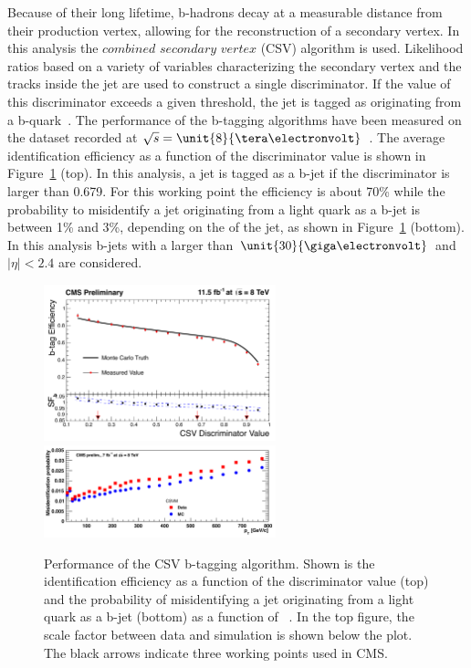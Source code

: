 Because of their long lifetime, b-hadrons decay at a measurable distance from their production vertex, allowing for the reconstruction of a secondary vertex. In this analysis the $\textit{combined}$ $\textit{secondary}$ $\textit{vertex}$ (CSV) algorithm is used. Likelihood ratios based on a variety of variables characterizing the secondary vertex and the tracks inside the jet are used to construct a single discriminator. If the value of this discriminator exceeds a given threshold, the jet is tagged as originating from a b-quark~\cite{Chatrchyan:2012jua}. The performance of the b-tagging algorithms have been measured on the dataset recorded at $\sqrt{s} = \unit{8}{\tera\electronvolt}$~\cite{CMS-DP-2013-005}. The average identification efficiency as a function of the discriminator value is shown in Figure~\ref{fig:bTagging} (top). In this analysis, a jet is tagged as a b-jet if the discriminator is larger than 0.679. For this working point the efficiency is about 70\% while the probability to misidentify a jet originating from a light quark as a b-jet is between 1\% and 3\%, depending on the \pt of the jet, as shown in Figure~\ref{fig:bTagging} (bottom). In this analysis b-jets with a \pt larger than $\unit{30}{\giga\electronvolt}$ and $|\eta| < 2.4$ are considered. 
\begin{figure}[htbp]
\centering

\includegraphics[width=0.6\textwidth]{plots/RECO/bTagEfficiency.png}\\

\includegraphics[width=0.6\textwidth]{plots/RECO/bTagMisID.png}\\

\caption{Performance of the CSV b-tagging algorithm. Shown is the identification efficiency as a function of the discriminator value (top) and the probability of misidentifying a jet originating from a light quark as a b-jet (bottom) as a function of \pt~\cite{CMS-DP-2013-005}. In the top figure, the scale factor between data and simulation is shown below the plot. The black arrows indicate three working points used in CMS.}
\label{fig:bTagging}
\end{figure} 

